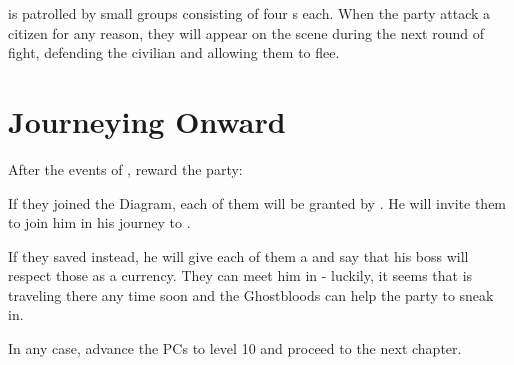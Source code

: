 \locationKharbranth{} is patrolled by small groups consisting of four \enemyDiagramMuscle{}s each. When the party attack a citizen for any reason, they will appear on the scene during the next round of fight, defending the civilian and allowing them to flee.

\newpage


















\section{Journeying Onward}

After the events of , reward the party:

If they joined the Diagram, each of them will be granted \abilityFutureKnowledgeName[2] by \npcTaravangian{}. He will invite them to join him in his journey to \locationUrithiru{}.

If they saved \npcGhostbloodWounded{} instead, he will give each of them a \lootScadrialCoin{} and say that his boss will respect those as a currency. They can meet him in \locationUrithiru{} - luckily, it seems that \npcTaravangian{} is traveling there any time soon and the Ghostbloods can help the party to sneak in.

In any case, advance the PCs to level 10 and proceed to the next chapter.


